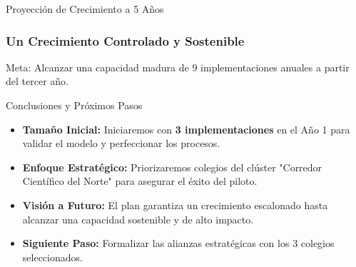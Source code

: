 \begin{frame}{Proyección de Crecimiento a 5 Años}
    \frametitle{Un Crecimiento Controlado y Sostenible}
    
    \begin{table}
    \centering
    \caption{Proyección de crecimiento hasta alcanzar la capacidad madura del proyecto.}
    \end{table}
    
    \vfill
    \begin{alertblock}{}
        Meta: Alcanzar una capacidad madura de 9 implementaciones anuales a partir del tercer año.
    \end{alertblock}
\end{frame}



\begin{frame}{Conclusiones y Próximos Pasos}
    \begin{itemize}
        \item<1-> \textbf{Tamaño Inicial:} Iniciaremos con \textbf{3 implementaciones} en el Año 1 para validar el modelo y perfeccionar los procesos.
        \item<2-> \textbf{Enfoque Estratégico:} Priorizaremos colegios del clúster "Corredor Científico del Norte" para asegurar el éxito del piloto.
        \item<3-> \textbf{Visión a Futuro:} El plan garantiza un crecimiento escalonado hasta alcanzar una capacidad sostenible y de alto impacto.
        \item<4-> \textbf{Siguiente Paso:} Formalizar las alianzas estratégicas con los 3 colegios seleccionados.
    \end{itemize}
\end{frame}
